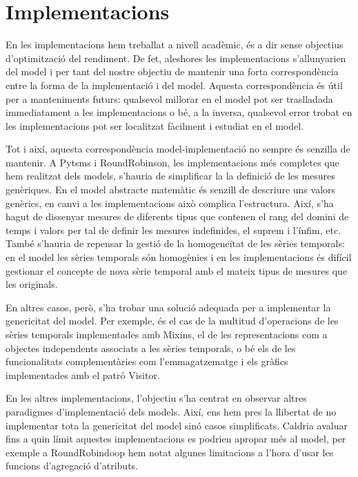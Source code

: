\section{Implementacions}


En les implementacions hem treballat a nivell acadèmic, és a dir sense
objectius d'optimització del rendiment. De fet, aleshores les
implementacions s'allunyarien del model i per tant del nostre objectiu
de mantenir una forta correspondència entre la forma de la
implementació i del model. Aquesta correspondència és útil per a
manteniments futurs: qualsevol millorar en el model pot ser
traslladada immediatament a les implementacions o bé, a la inversa,
qualsevol error trobat en les implementacions pot ser localitzat
fàcilment i estudiat en el model.





Tot i així, aquesta correspondència model-implementació no sempre és
senzilla de mantenir. A Pytsms i RoundRobinson, les implementacions
més completes que hem realitzat dels models, s'hauria de simplificar
la la definició de les mesures genèriques.  En el model abstracte
matemàtic és senzill de descriure uns valors genèrics, en canvi a les
implementacions això complica l'estructura. Així, s'ha hagut de
dissenyar mesures de diferents tipus que contenen el rang del domini
de temps i valors per tal de definir les mesures indefinides, el
suprem i l'ínfim, etc.  També s'hauria de repensar la gestió de la
homogeneïtat de les sèries temporals: en el model les sèries temporals
són homogènies i en les implementacions és difícil gestionar el
concepte de nova sèrie temporal amb el mateix tipus de mesures que les
originals.

En altres casos, però, s'ha trobar una solució adequada per a
implementar la genericitat del model.  Per exemple, és el cas de la
multitud d'operacions de les sèries temporals implementades amb
Mixins, el de les representacions com a objectes independents
associats a les sèries temporals, o bé els de les funcionalitats
complementàries com l'emmagatzematge i els gràfics implementades amb
el patró Visitor. 






En les altres implementacions, l'objectiu s'ha centrat en observar
altres paradigmes d'implementació dels models. Així, ens hem pres la
llibertat de no implementar tota la genericitat del model sinó casos
simplificats. Caldria avaluar fins a quin límit aquestes
implementacions es podrien apropar més al model, per exemple a
RoundRobindoop hem notat algunes limitacions a l'hora d'usar les
funcions d'agregació d'atributs.


